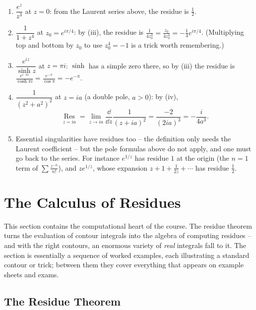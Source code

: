 \documentclass[a4paper]{scrartcl}
\newcommand{\Res}{\operatorname*{Res}}
\begin{document}
\begin{example}
	\begin{enumerate}[label=(\roman*)]
		\item $\dfrac{e^z}{z^3}$ at $z = 0$: from the Laurent series above, the residue is $\frac{1}{2}$.
		\item $\dfrac{1}{1 + z^4}$ at $z_0 = e^{i\pi/4}$: by (iii), the residue is $\frac{1}{4z_0^3} = \frac{z_0}{4z_0^4} = -\frac{1}{4}e^{i\pi/4}$. (Multiplying top and bottom by $z_0$ to use $z_0^4 = -1$ is a trick worth remembering.)
		\item $\dfrac{e^{iz}}{\sinh z}$ at $z = \pi i$: $\sinh$ has a simple zero there, so by (iii) the residue is $\frac{e^{i \cdot \pi i}}{\cosh \pi i} = \frac{e^{-\pi}}{\cos \pi} = -e^{-\pi}$.
		\item $\dfrac{1}{(z^2 + a^2)^2}$ at $z = ia$ (a double pole, $a > 0$): by (iv),
		$$
		\Res_{z = ia} = \lim_{z \to ia} \frac{\dd}{\dd z} \frac{1}{(z + ia)^2} = \frac{-2}{(2ia)^3} = -\frac{i}{4a^3}.
		$$
		\item Essential singularities have residues too -- the definition only needs the Laurent coefficient -- but the pole formulas above do not apply, and one must go back to the series. For instance $e^{1/z}$ has residue $1$ at the origin (the $n = 1$ term of $\sum \frac{z^{-n}}{n!}$), and $z e^{1/z}$, whose expansion $z + 1 + \frac{1}{2z} + \cdots$ has residue $\frac 12$.
	\end{enumerate}
\end{example}

\section{The Calculus of Residues}

This section contains the computational heart of the course. The residue theorem turns the evaluation of contour integrals into the algebra of computing residues -- and with the right contours, an enormous variety of \emph{real} integrals fall to it. The section is essentially a sequence of worked examples, each illustrating a standard contour or trick; between them they cover everything that appears on example sheets and exams.

\subsection{The Residue Theorem}
\end{document}
